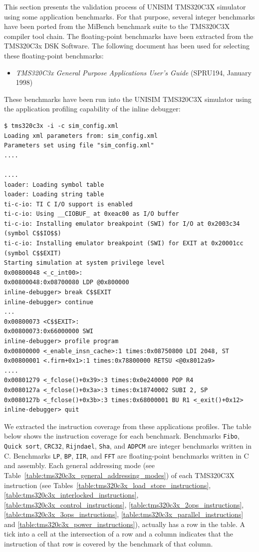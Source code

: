 This section presents the validation process of UNISIM TMS320C3X simulator using some application benchmarks.
For that purpose, several integer benchmarks have been ported from the MiBench benchmark suite to the TMS320C3X compiler tool chain.
The floating-point benchmarks have been extracted from the TMS320C3x DSK Software.
The following document has been used for selecting these floating-point benchmarks:
\begin{itemize}
\item \textit{TMS320C3x General Purpose Applications User's Guide} (SPRU194, January 1998)
\end{itemize}

These benchmarks have been run into the UNISIM TMS320C3X simulator using the application profiling capability of the inline debugger:
\begin{verbatim}
$ tms320c3x -i -c sim_config.xml
Loading xml parameters from: sim_config.xml
Parameters set using file "sim_config.xml"
....

....
loader: Loading symbol table
loader: Loading string table
ti-c-io: TI C I/O support is enabled
ti-c-io: Using __CIOBUF_ at 0xeac00 as I/O buffer
ti-c-io: Installing emulator breakpoint (SWI) for I/O at 0x2003c34 (symbol C$$IO$$)
ti-c-io: Installing emulator breakpoint (SWI) for EXIT at 0x20001cc (symbol C$$EXIT)
Starting simulation at system privilege level
0x00800048 <_c_int00>:
0x00800048:0x08700080 LDP @0x800000
inline-debugger> break C$$EXIT
inline-debugger> continue
...
0x00800073 <C$$EXIT>:
0x00800073:0x66000000 SWI
inline-debugger> profile program
0x00800000 <_enable_insn_cache>:1 times:0x08750800 LDI 2048, ST                                                                                                                                      
0x00800001 <.firm+0x1>:1 times:0x78800000 RETSU <@0x8012a9>                                                                                                                                          
....
0x00801279 <_fclose()+0x39>:3 times:0x0e240000 POP R4
0x0080127a <_fclose()+0x3a>:3 times:0x18740002 SUBI 2, SP
0x0080127b <_fclose()+0x3b>:3 times:0x68000001 BU R1 <_exit()+0x12>
inline-debugger> quit
\end{verbatim}

We extracted the instruction coverage from these applications profiles.
The table below shows the instruction coverage for each benchmark.
Benchmarks \texttt{Fibo}, \texttt{Quick sort}, \texttt{CRC32}, \texttt{Rijndael}, \texttt{Sha}, and \texttt{ADPCM} are integer benchmarks written in C.
Benchmarks \texttt{LP}, \texttt{BP}, \texttt{IIR}, and \texttt{FFT} are floating-point benchmarks written in C and assembly.
Each general addressing mode (see Table~\ref{table:tms320c3x_general_addressing_modes}) of each TMS320C3X instruction (see Tables~\ref{table:tms320c3x_load_store_instructions}, \ref{table:tms320c3x_interlocked_instructions},  \ref{table:tms320c3x_control_instructions}, \ref{table:tms320c3x_2ops_instructions}, \ref{table:tms320c3x_3ops_instructions}, \ref{table:tms320c3x_parallel_instructions} and \ref{table:tms320c3x_power_instructions}), actually has a row in the table.
A tick into a cell at the intersection of a row and a column indicates that the instruction of that row is covered by the benchmark of that column.

